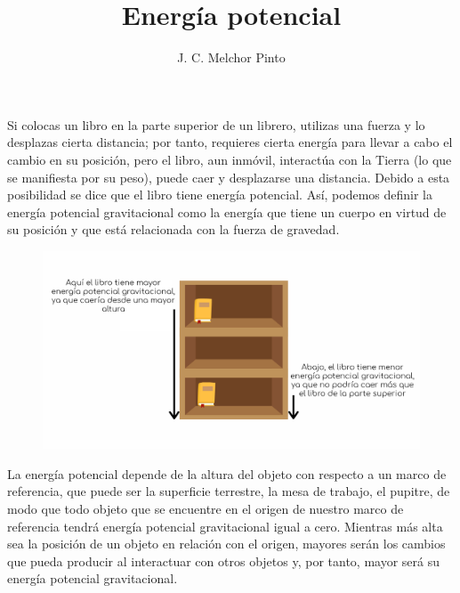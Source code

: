 \documentclass[12pt]{guia}
\title{Energía potencial}
\author{J. C. Melchor Pinto}
\begin{document}
\pagestyle{headandfoot}
\addpoints
\INFO
\begin{opening}{
        \begin{minipage}{0.45\textwidth}
            Si colocas un libro en la parte superior de un librero, utilizas una fuerza y lo
            desplazas cierta distancia; por tanto, requieres cierta energía para llevar a cabo el
            cambio en su posición, pero el libro, aun inmóvil, interactúa con la Tierra (lo que se
            manifiesta por su peso), puede caer y desplazarse una distancia. Debido a esta
            posibilidad se dice que el libro tiene energía potencial. Así, podemos definir la energía
            potencial gravitacional como la energía que tiene un cuerpo en virtud de su posición
            y que está relacionada con la fuerza de gravedad.
        \end{minipage}\hfill
        \begin{minipage}{0.55\textwidth}
            \begin{figure}[H]
                \centering
                \includegraphics[width=\linewidth]{../images/Gravitational-potential-energy.png}
            \end{figure}%
        \end{minipage}

        La energía potencial depende de la altura del objeto con respecto a un marco de
        referencia, que puede ser la superficie terrestre, la mesa de trabajo, el pupitre,
        de modo que todo objeto que se encuentre en el origen de nuestro marco de referencia tendrá energía potencial gravitacional igual a cero. Mientras más alta sea la posición de un objeto en relación con el origen, mayores serán los cambios que pueda
        producir al interactuar con otros objetos y, por tanto, mayor será su energía potencial
        gravitacional.\\

}
\end{opening}
\end{document}
